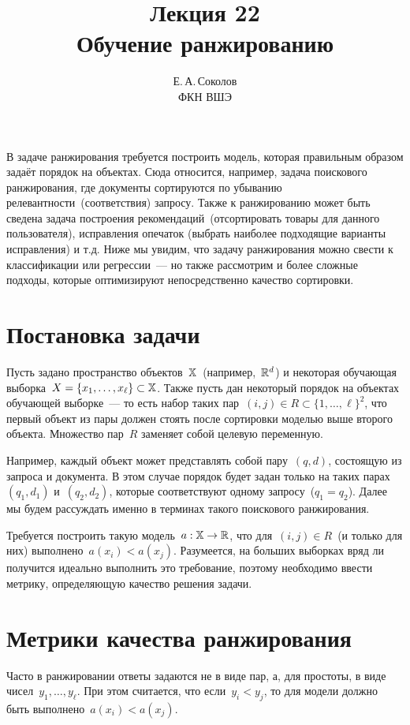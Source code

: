 \documentclass[12pt,fleqn]{article}
\begin{document}
\title{Лекция 22\\Обучение ранжированию}
\author{Е.\,А.\,Соколов\\ФКН ВШЭ}
\maketitle

В задаче ранжирования требуется построить модель, которая правильным образом
задаёт порядок на объектах.
Сюда относится, например, задача поискового ранжирования, где документы сортируются
по убыванию релевантности~(соответствия) запросу.
Также к ранжированию может быть сведена задача построения рекомендаций~(отсортировать товары
для данного пользователя),
исправления опечаток (выбрать наиболее подходящие варианты исправления) и т.д.
Ниже мы увидим, что задачу ранжирования можно свести к классификации или регрессии~---
но также рассмотрим и более сложные подходы, которые оптимизируют непосредственно
качество сортировки.

\section{Постановка задачи}
Пусть задано пространство объектов~$\mathbb{X}$~(например,~$\mathbb{R}^d$)
и некоторая обучающая выборка~$X = \{x_1, \dots, x_\ell\} \subset \mathbb{X}$.
Также пусть дан некоторый порядок на объектах обучающей выборке~---
то есть набор таких пар~$(i, j) \in R \subset \{1, \dots, \ell\}^2$, что первый объект из пары
должен стоять после сортировки моделью выше второго объекта.
Множество пар~$R$ заменяет собой целевую переменную.

Например, каждый объект может представлять собой пару~$(q, d)$,
состоящую из запроса и документа.
В этом случае порядок будет задан только на таких парах~$(q_1, d_1)$ и~$(q_2, d_2)$,
которые соответствуют одному запросу~($q_1 = q_2$).
Далее мы будем рассуждать именно в терминах такого поискового ранжирования.

Требуется построить такую модель~$a: \mathbb{X} \to \mathbb{R}$,
что для~$(i, j) \in R$~(и только для них) выполнено~$a(x_i) < a(x_j)$.
Разумеется, на больших выборках вряд ли получится идеально выполнить это требование,
поэтому необходимо ввести метрику, определяющую качество решения задачи.

\section{Метрики качества ранжирования}

Часто в ранжировании ответы задаются не в виде пар, а, для простоты,
в виде чисел~$y_1, \dots, y_\ell$.
При этом считается, что если~$y_i < y_j$, то для модели должно быть выполнено~$a(x_i) < a(x_j)$.
\end{document}
